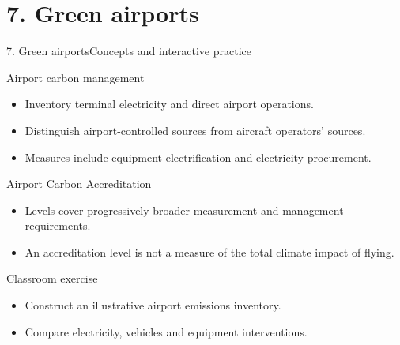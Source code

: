 \documentclass[aspectratio=169,11pt]{beamer}
\begin{document}
\section{7. Green airports}
\begin{frame}{7. Green airports}\centering\Large Concepts and interactive practice\end{frame}
\begin{frame}{Airport carbon management}\begin{itemize}
\item Inventory terminal electricity and direct airport operations.
\item Distinguish airport-controlled sources from aircraft operators' sources.
\item Measures include equipment electrification and electricity procurement.
\end{itemize}\end{frame}
\begin{frame}{Airport Carbon Accreditation}\begin{itemize}
\item Levels cover progressively broader measurement and management requirements.
\item An accreditation level is not a measure of the total climate impact of flying.
\end{itemize}\end{frame}
\begin{frame}{Classroom exercise}\begin{itemize}
\item Construct an illustrative airport emissions inventory.
\item Compare electricity, vehicles and equipment interventions.
\end{itemize}\end{frame}
\end{document}
